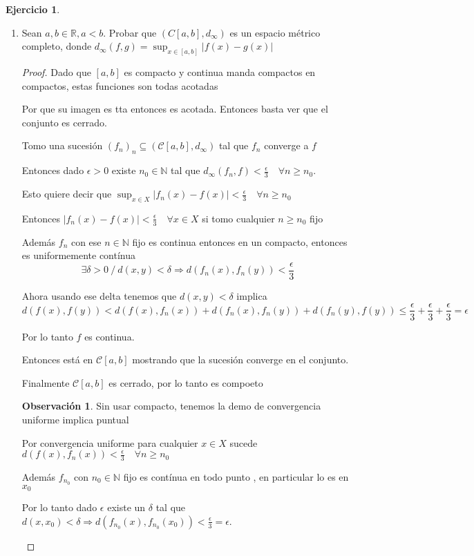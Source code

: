 \documentclass[11pt]{report}
\newcommand{\R}{\mathbb{R}}
\newcommand{\N}{\mathbb{N}}
\newcommand{\Ra}{\Rightarrow}
\theoremstyle{definition}
\newtheorem*{remark}{Observación}
\newtheorem{ej}{Ejercicio}
\begin{document}
\begin{ej}
\begin{enumerate}
				
			\item Sean $a,b\in \R, a < b$. Probar que $(C[a,b],d_{\infty})$ es un espacio métrico completo, donde $d_{\infty}(f,g) = \sup_{x\in [a,b]}|f(x)-g(x)|$

				\begin{proof}
					Dado que $[a,b]$ es compacto y continua manda compactos en compactos, estas funciones son todas acotadas 

					Por que su imagen es tta entonces es acotada. Entonces basta ver que el conjunto es cerrado.

					Tomo una sucesión $(f_n)_n \subseteq (\mathcal{C}[a,b],d_{\infty})$ tal que $f_n$ converge a $f$

				Entonces dado $\epsilon > 0 $ existe $n_0\in \N$ tal que $d_{\infty}(f_n,f) < \frac{\epsilon}{3} \quad \forall n \geq n_0$.

				Esto quiere decir que $\sup_{x\in X} |f_n(x) - f(x) | < \frac{\epsilon}{3} \quad \forall n \geq n_0$

				Entonces $|f_n(x)-f(x)| < \frac{\epsilon}{3} \quad \forall x \in X$ si tomo cualquier $n \geq n_0$ fijo

				Además $f_n$ con ese $n \in \N$ fijo es continua entonces en un compacto, entonces es uniformemente contínua 
			$$\exists \delta >0 \ / \ d(x,y) < \delta \Ra d(f_n(x),f_n(y)) < \frac{\epsilon}{3}$$

				Ahora usando ese delta tenemos que $d(x,y) < \delta$ implica 
				$$d(f(x),f(y)) < d(f(x),f_n(x)) + d(f_n(x),f_n(y)) + d(f_n(y),f(y)) \leq \frac{\epsilon}{3} + \frac{\epsilon}{3} + \frac{\epsilon}{3}= \epsilon  $$

				Por lo tanto $f$ es continua.

				Entonces está en $\mathcal{C}[a,b]$ mostrando que la sucesión converge en el conjunto. 

			 	Finalmente $\mathcal{C}[a,b]$ es cerrado, por lo tanto es compoeto

				\begin{remark} Sin usar compacto, tenemos la demo de convergencia uniforme implica puntual
					
				        Por convergencia uniforme para cualquier $x \in X$ sucede $d(f(x),f_n(x)) < \frac{\epsilon}{3} \quad \forall n\geq n_0$ 

					Además $f_{n_0}$ con $n_0 \in \N$ fijo es contínua en todo punto , en particular lo es en $x_0$

					Por lo tanto dado $\epsilon$ existe un $\delta$ tal que $d(x,x_0) < \delta \Ra d(f_{n_0}(x),f_{n_0}(x_0))< \frac{\epsilon}{3} = \epsilon$.


\end{remark}
\end{proof}
\end{enumerate}
\end{ej}
\end{document}
